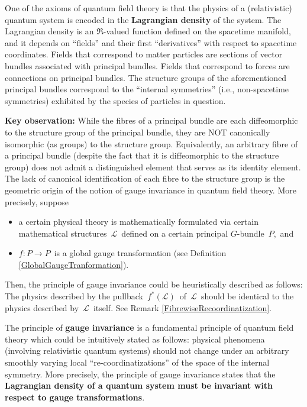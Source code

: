 \begin{remark}
\mbox{}
\vskip 0.1cm
\noindent
One of the axioms of quantum field theory is that the physics of a (relativistic) quantum
system is encoded in the \textbf{Lagrangian density} of the system.
The Lagrangian density is an $\Re$-valued function defined on the spacetime manifold, and it depends on
``fields'' and their first ``derivatives'' with respect to spacetime coordinates.
Fields that correspond to matter particles are sections of vector bundles associated with principal bundles.
Fields that correspond to forces are connections on principal bundles.
The structure groups of the aforementioned principal bundles correspond to the ``internal symmetries''
(i.e., non-spacetime symmetries) exhibited by the species of particles in question.
\vskip 0.3cm
\begin{center}
\begin{minipage}{5.5in}
\noindent
\textbf{Key observation:}\;
While the fibres of a principal bundle are each diffeomorphic to the structure group of the principal bundle,
they are {\color{red}NOT canonically isomorphic} (as groups) to the structure group.
Equivalently, an arbitrary fibre of a principal bundle
(despite the fact that it is diffeomorphic to the structure group)
{\color{red}does not admit a distinguished element} that serves as its identity element.
\vskip 0.1cm
The lack of canonical identification of each fibre to the structure group
is the {\color{red}geometric origin} of the notion of gauge invariance in quantum field theory.
More precisely, suppose
\begin{itemize}
\item
	a certain physical theory is mathematically formulated
	via certain mathematical structures \,$\mathcal{L}$\,
	defined on a certain principal $G$-bundle \,$P$,\, and
\item
	$f : P \longrightarrow P$\, is a global gauge transformation
	(see Definition \ref{GlobalGaugeTranformation}).
\end{itemize}
Then, the principle of gauge invariance could be heuristically described as follows:
The physics described by the pullback
\,$f^{*}(\mathcal{L})$\, of \,$\mathcal{L}$\,
{\color{red}should be identical} to the physics described by \,$\mathcal{L}$\,
itself.
See Remark \ref{FibrewiseRecoordinatization}.
\end{minipage}
\end{center}
\vskip 0.1cm
The principle of \textbf{gauge invariance} is a fundamental principle of quantum field theory
which could be intuitively stated as follows:
physical phenomena (involving relativistic quantum systems) should not change under
an arbitrary smoothly varying local ``re-coordinatizations'' of the space of the internal symmetry.
More precisely, the principle of gauge invariance states that
the \textbf{Lagrangian density of a quantum system must be invariant with respect to gauge transformations}.
\end{remark}

